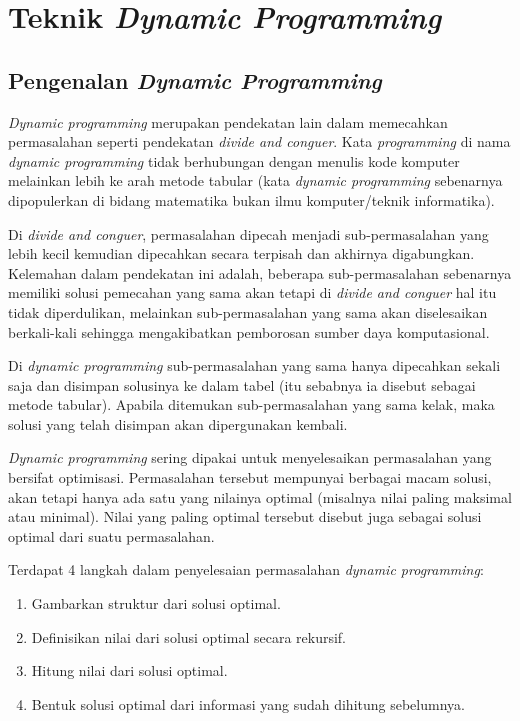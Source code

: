 \chapter{Teknik \textit{Dynamic Programming}}\label{ch:modul5}

\section{Pengenalan \textit{Dynamic Programming}}
\textit{Dynamic programming} merupakan pendekatan lain dalam memecahkan permasalahan seperti pendekatan \textit{divide and conguer}. Kata \textit{programming} di nama \textit{dynamic programming} tidak berhubungan dengan menulis kode komputer melainkan lebih ke arah metode tabular (kata \textit{dynamic programming} sebenarnya dipopulerkan di bidang matematika bukan ilmu komputer/teknik informatika).

Di \textit{divide and conguer}, permasalahan dipecah menjadi sub-permasalahan yang lebih kecil kemudian dipecahkan secara terpisah dan akhirnya digabungkan. Kelemahan dalam pendekatan ini adalah, beberapa sub-permasalahan sebenarnya memiliki solusi pemecahan yang sama akan tetapi di \textit{divide and conguer} hal itu tidak diperdulikan, melainkan sub-permasalahan yang sama akan diselesaikan berkali-kali sehingga mengakibatkan pemborosan sumber daya komputasional.

Di \textit{dynamic programming} sub-permasalahan yang sama hanya dipecahkan sekali saja dan disimpan solusinya ke dalam tabel (itu sebabnya ia disebut sebagai metode tabular). Apabila ditemukan sub-permasalahan yang sama kelak, maka solusi yang telah disimpan akan dipergunakan kembali.

\textit{Dynamic programming} sering dipakai untuk menyelesaikan permasalahan yang bersifat optimisasi. Permasalahan tersebut mempunyai berbagai macam solusi, akan tetapi hanya ada satu yang nilainya optimal (misalnya nilai paling maksimal atau minimal). Nilai yang paling optimal tersebut disebut juga sebagai solusi optimal dari suatu permasalahan.

Terdapat 4 langkah dalam penyelesaian permasalahan \textit{dynamic programming}:
\begin{enumerate}
	\item Gambarkan struktur dari solusi optimal.
	\item Definisikan nilai dari solusi optimal secara rekursif.
	\item Hitung nilai dari solusi optimal.
	\item Bentuk solusi optimal dari informasi yang sudah dihitung sebelumnya.
\end{enumerate}

